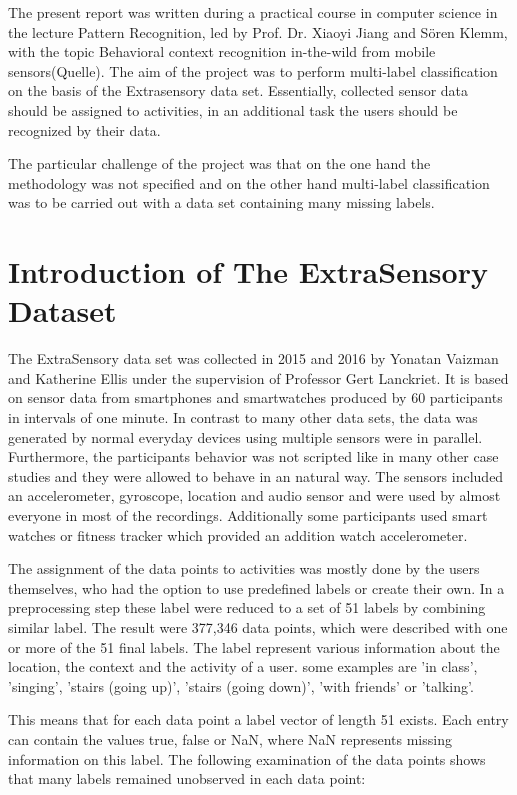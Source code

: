 \documentclass[a4paper,12pt]{scrartcl}
\newcommand{\gr}{\grqq{}}
\newcommand{\gl}{\glqq}
\begin{document}
The present report was written during a practical course in computer science in the lecture Pattern Recognition, led by Prof. Dr. Xiaoyi Jiang and Sören Klemm, with the topic \gl Behavioral context recognition in-the-wild from mobile sensors\gr (Quelle). The aim of the project was to perform multi-label classification on the basis of the Extrasensory data set. Essentially, collected sensor data should be assigned to activities, in an additional task the users should be recognized by their data. 

The particular challenge of the project was that on the one hand the methodology was not specified and on the other hand multi-label classification was to be carried out with a data set containing many missing labels. 

\section{Introduction of The ExtraSensory Dataset}

The ExtraSensory data set was collected in 2015 and 2016 by Yonatan Vaizman and Katherine Ellis under the supervision of Professor Gert Lanckriet. It is based on sensor data from smartphones and smartwatches produced by 60 participants in intervals of one minute. In contrast to many other data sets, the data was generated by normal everyday devices using multiple sensors were in parallel. Furthermore, the participants behavior was not scripted like in many other case studies and they were allowed to behave in an natural way. The sensors included an accelerometer, gyroscope, location and audio sensor and were used by almost everyone in most of the recordings. Additionally some participants used smart watches or fitness tracker which provided an addition watch accelerometer.

The assignment of the data points to activities was mostly done by the users themselves, who had the option to use predefined labels or create their own. In a preprocessing step these label were reduced to a set of 51 labels by combining similar label. The result were 377,346 data points, which were described with one or more of the 51 final labels. The label represent various information about the location, the context and the activity of a user. some examples are 'in class', 'singing', 'stairs (going up)', 'stairs (going down)', 'with friends' or 'talking'.

This means that for each data point a label vector of length 51 exists. Each entry can contain the values true, false or NaN, where NaN represents missing information on this label. The following examination of the data points shows that many labels remained unobserved in each data point:
\end{document}
